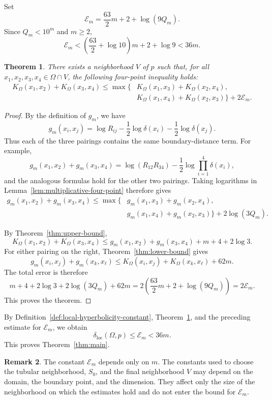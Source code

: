 \documentclass[11pt]{article}
\newtheorem{theorem}{Theorem}[section]
\theoremstyle{definition}
\newtheorem{remark}[theorem]{Remark}
\begin{document}
Set
\[
\mathcal E_m=\frac{63}{2}m+2+\log(9Q_m).
\]
Since \(Q_m<10^m\) and \(m\ge2\),
\[
\mathcal E_m
<\left(\frac{63}{2}+\log10\right)m+2+\log9
<36m.
\]

\begin{theorem}\label{thm:four-point}
There exists a neighborhood \(V\) of \(p\) such that, for all
\(x_1,x_2,x_3,x_4\in\Omega\cap V\), the following four-point
inequality holds:
\[
\begin{aligned}
K_\Omega(x_1,x_2)+K_\Omega(x_3,x_4)
\le
\max\bigl\{&
K_\Omega(x_1,x_3)+K_\Omega(x_2,x_4),\\
&
K_\Omega(x_1,x_4)+K_\Omega(x_2,x_3)
\bigr\}
+2\mathcal E_m.
\end{aligned}
\]
\end{theorem}

\begin{proof}
By the definition of \(g_m\), we have
\[
g_m(x_i,x_j)
=
\log R_{ij}
-\frac12\log\delta(x_i)
-\frac12\log\delta(x_j).
\]
Thus each of the three pairings contains the same boundary-distance
term.  For example,
\[
g_m(x_1,x_2)+g_m(x_3,x_4)
=
\log(R_{12}R_{34})
-\frac12\log\prod_{i=1}^4\delta(x_i),
\]
and the analogous formulas hold for the other two pairings.
Taking logarithms in Lemma~\ref{lem:multiplicative-four-point} therefore
gives
\[
\begin{aligned}
g_m(x_1,x_2)+g_m(x_3,x_4)
\le
\max\bigl\{&
g_m(x_1,x_3)+g_m(x_2,x_4),\\
&
g_m(x_1,x_4)+g_m(x_2,x_3)
\bigr\}
+2\log(3Q_m).
\end{aligned}
\]

By Theorem~\ref{thm:upper-bound},
\[
K_\Omega(x_1,x_2)+K_\Omega(x_3,x_4)
\le g_m(x_1,x_2)+g_m(x_3,x_4)+m+4+2\log3.
\]
For either pairing on the right, Theorem~\ref{thm:lower-bound} gives
\[
g_m(x_i,x_j)+g_m(x_k,x_\ell)
\le K_\Omega(x_i,x_j)+K_\Omega(x_k,x_\ell)+62m.
\]
The total error is therefore
\[
m+4+2\log3+2\log(3Q_m)+62m
=2\left(\frac{63}{2}m+2+\log(9Q_m)\right)
=2\mathcal E_m.
\]
This proves the theorem.
\end{proof}

By Definition~\ref{def:local-hyperbolicity-constant},
Theorem~\ref{thm:four-point}, and the preceding estimate for
\(\mathcal E_m\), we obtain
\[
\delta_{\mathrm{loc}}(\Omega,p)
\le
\mathcal E_m
<
36m.
\]
This proves Theorem~\ref{thm:main}.

\begin{remark}
The constant \(\mathcal E_m\) depends only on \(m\).  The constants used
to choose the tubular neighborhood, \(S_0\), and the final neighborhood
\(V\) may depend on the domain, the boundary point, and the dimension.
They affect only the size of the neighborhood on which the estimates
hold and do not enter the bound for \(\mathcal E_m\).
\end{remark}
\end{document}
